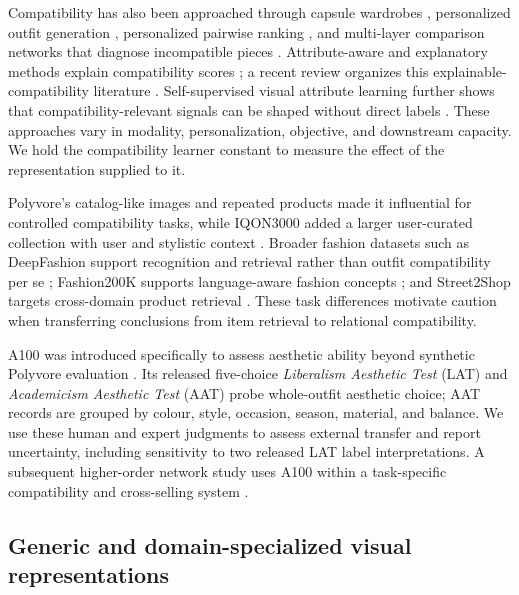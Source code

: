 \documentclass[pdflatex,sn-mathphys-num,iicol]{sn-jnl}
\begin{document}
Compatibility has also been approached through capsule wardrobes \cite{hsiao2018capsule}, personalized outfit generation \cite{chen2019pog}, personalized pairwise ranking \cite{song2019gpbpr}, and multi-layer comparison networks that diagnose incompatible pieces \cite{wang2019mcn}. Attribute-aware and explanatory methods explain compatibility scores \cite{yang2019attributes,chen2019visualexplanations,lin2020explainable,balim2023diagnosing,wang2024pfe,li2024attribute}; a recent review organizes this explainable-compatibility literature \cite{selwon2024explainable}. Self-supervised visual attribute learning further shows that compatibility-relevant signals can be shaped without direct labels \cite{kim2021sval}. These approaches vary in modality, personalization, objective, and downstream capacity. We hold the compatibility learner constant to measure the effect of the representation supplied to it.

Polyvore's catalog-like images and repeated products made it influential for controlled compatibility tasks, while IQON3000 added a larger user-curated collection with user and stylistic context \cite{nakamura2018iqon}. Broader fashion datasets such as DeepFashion support recognition and retrieval rather than outfit compatibility per se \cite{liu2016deepfashion}; Fashion200K supports language-aware fashion concepts \cite{han2017spatial}; and Street2Shop targets cross-domain product retrieval \cite{kiapour2015street}. These task differences motivate caution when transferring conclusions from item retrieval to relational compatibility.

A100 was introduced specifically to assess aesthetic ability beyond synthetic Polyvore evaluation \cite{zou2022a100}. Its released five-choice \emph{Liberalism Aesthetic Test} (LAT) and \emph{Academicism Aesthetic Test} (AAT) probe whole-outfit aesthetic choice; AAT records are grouped by colour, style, occasion, season, material, and balance. We use these human and expert judgments to assess external transfer and report uncertainty, including sensitivity to two released LAT label interpretations. A subsequent higher-order network study uses A100 within a task-specific compatibility and cross-selling system \cite{pang2026crossselling}.

\subsection{Generic and domain-specialized visual representations}
\end{document}
